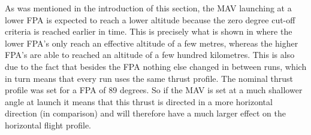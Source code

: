 \noindent
As was mentioned in the introduction of this section, the \ac{MAV} launching at a lower \ac{FPA} is expected to reach a lower altitude because the zero degree cut-off criteria is reached earlier in time. This is precisely what is shown in  where the lower \ac{FPA}'s only reach an effective altitude of a few metres, whereas the higher \ac{FPA}'s are able to reached an altitude of a few hundred kilometres. This is also due to the fact that besides the \ac{FPA} nothing else changed in between runs, which in turn means that every run uses the same thrust profile. The nominal thrust profile was set for a \ac{FPA} of 89 degrees. So if the \ac{MAV} is set at a much shallower angle at launch it means that this thrust is directed in a more horizontal direction (in comparison) and will therefore have a much larger effect on the horizontal flight profile.


